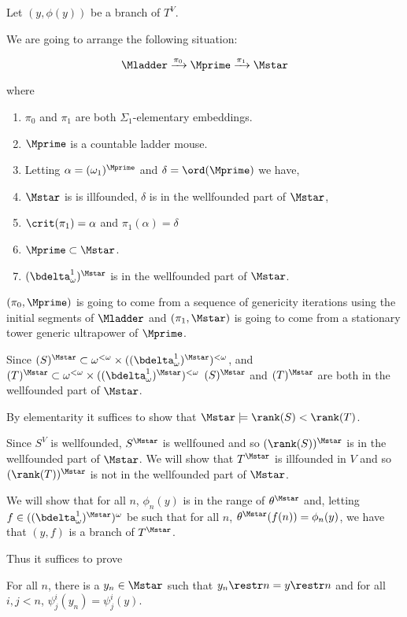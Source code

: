 \documentclass[oneside,12pt]{amsart}
\begin{document}
Let $(y,\phi(y))$ be a branch of $T^V$.


We are going to arrange the following situation:

\begin{equation}
\label{big-setup}
\Mladder \xrightarrow{\pi_0} \Mprime \xrightarrow{\pi_1} \Mstar
\end{equation}

where

\begin{enumerate}
\item $\pi_0$ and $\pi_1$ are both $\Sigma_1$-elementary embeddings.
\item $\Mprime$ is a countable ladder mouse.
\item Letting $\alpha=(\omega_1)^{\Mprime}$ and $\delta=\ord(\Mprime)$ we have,
\item $\Mstar$ is is illfounded, $\delta$ is in the wellfounded part of $\Mstar$,
\item $\crit(\pi_1) = \alpha$ and $\pi_1(\alpha)=\delta$
\item $\Mprime \subset \Mstar$.
\item $(\bdelta^1_\omega)^{\Mstar}$ is in the wellfounded part of $\Mstar$.
\end{enumerate}

$(\pi_0, \Mprime)$ is going to come from a sequence of genericity iterations using
the initial segments of $\Mladder$ and $(\pi_1,\Mstar)$
is going to come from a stationary tower generic ultrapower of $\Mprime$.

Since $(S)^{\Mstar} \subset \omega^{<\omega}\times ((\bdelta^1_\omega)^{\Mstar})^{<\omega}$,
and
$(T)^{\Mstar} \subset \omega^{<\omega}\times ((\bdelta^1_\omega)^{\Mstar})^{<\omega}$
$(S)^{\Mstar}$ and $(T)^{\Mstar}$ are both in the wellfounded part of $\Mstar$.

By elementarity it suffices to show that $\Mstar \models \rank(S) < \rank(T)$.

Since $S^V$ is wellfounded, $S^{\Mstar}$ is wellfouned and so $(\rank(S))^{\Mstar}$ is in the
wellfounded part of $\Mstar$. We will show that $T^{\Mstar}$
is illfounded in $V$ and so $(\rank(T))^{\Mstar}$ is not in the wellfounded part of $\Mstar$.

We will show that for all $n$, $\phi_n(y)$ is in the range of $\theta^{\Mstar}$ and,
letting $f\in ((\bdelta^1_\omega)^{\Mstar})^{\omega}$ be such that for all $n$,
$\theta^{\Mstar}(f(n)) = \phi_n(y)$, we have that $(y,f)$ is a branch of $T^{\Mstar}$.

Thus it suffices to prove

\begin{lemma}
For all $n$, there is a $y_n\in \Mstar$ such that $y_n\restr n = y \restr n$ and
for all $i,j < n$, $\psi^i_j(y_n) = \psi^i_j(y)$.
\end{lemma}
\end{document}

